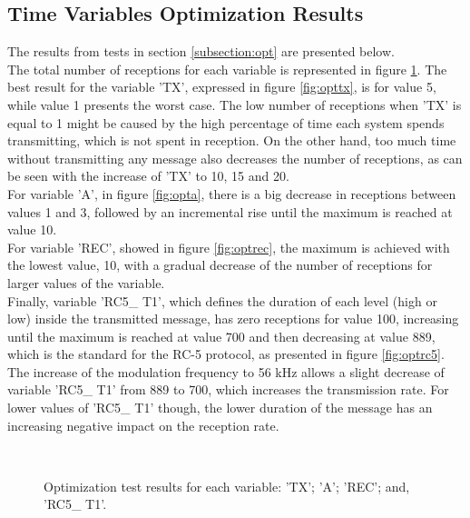 \subsection{Time Variables Optimization Results}
\label{subsection:optresults}
The results from tests in section \ref{subsection:opt} are presented below.\\
The total number of receptions for each variable is represented in figure \ref{fig:optresults1}. 
The best result for the variable 'TX', expressed in figure \ref{fig:opttx}, is for value 5, while value 1 presents the worst case. The low number of receptions when 'TX' is equal to 1 might be caused by the high percentage of time each system spends transmitting, which is not spent in reception. On the other hand, too much time without transmitting any message also decreases the number of receptions, as can be seen with the increase of 'TX' to 10, 15 and 20.\\
For variable 'A', in figure \ref{fig:opta}, there is a big decrease in receptions between values 1 and 3, followed by an incremental rise until the maximum is reached at value 10. \\
For variable 'REC', showed in figure \ref{fig:optrec}, the maximum is achieved with the lowest value, 10, with a gradual decrease of the number of receptions for larger values of the variable.\\
Finally, variable 'RC5\_ T1', which defines the duration of each level (high or low) inside the transmitted message, has zero receptions for value 100, increasing until the maximum is reached at value 700 and then decreasing at value 889, which is the standard for the RC-5 protocol, as presented in figure \ref{fig:optrc5}. The increase of the modulation frequency to 56 kHz allows a slight decrease of variable 'RC5\_ T1' from 889 to 700, which increases the transmission rate. For lower values of 'RC5\_ T1' though, the lower duration of the message has an increasing negative impact on the reception rate.\\

\begin{figure}[!ht]
  \centering
  \hspace{8pt}
  \\
  \hspace{8pt}
  \caption[Optimization Test Results for each Variable]{Optimization test results for each variable:
			 'TX';
			 'A';
			 'REC'; and,
			 'RC5\_ T1'.}%
  \label{fig:optresults1}%
\end{figure}

